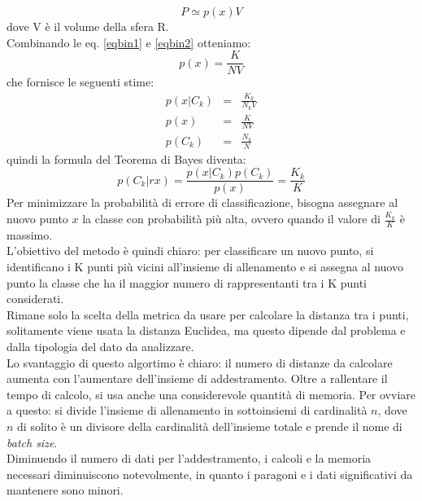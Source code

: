 \documentclass[a4paper,12pt,oneside]{book}
\begin{document}
\begin{equation} \label{eqbin2}
P\simeq p(x)V
\end{equation}
dove V \`{e} il volume della sfera R.\\
Combinando le eq. \ref{eqbin1} e \ref{eqbin2} otteniamo:
\begin{equation}
p(x)=\frac{K}{NV}
\end{equation}
che fornisce le seguenti stime:
\begin{eqnarray}
p(x|C_k)&=&\frac{K_k}{N_k V}\\
p(x)&=&\frac{K}{NV}\\
p(C_k)&=&\frac{N_k}{N}
\end{eqnarray}
quindi la formula del Teorema di Bayes diventa:%
\begin{equation}
p(C_k|r x)=\frac{p(x| C_k)p(C_k)}{p(x)}=\frac{K_k}{K}
\end{equation} 
Per minimizzare la probabilit\`{a} di errore di classificazione, bisogna assegnare al nuovo punto $x$ la classe con probabilit\`{a} pi\`{u} alta, ovvero quando il valore di $\frac{K_k}{K}$ \`{e} massimo.\\
L'obiettivo del metodo \`{e} quindi chiaro: per classificare un nuovo punto, si identificano i K punti pi\`{u} vicini all'insieme di allenamento e si assegna al nuovo punto la classe che ha il maggior numero di rappresentanti tra i K punti considerati.\\
Rimane solo la scelta della metrica da usare per calcolare la distanza tra i punti, solitamente viene usata la distanza Euclidea, ma questo dipende dal problema e dalla tipologia del dato da analizzare.\\
Lo svantaggio di questo algortimo \`{e} chiaro: il numero di distanze da calcolare aumenta con l'aumentare dell'insieme di addestramento. Oltre a rallentare il tempo di calcolo, si usa anche una considerevole quantit\`{a} di memoria. Per ovviare a questo: si divide l'insieme di allenamento in sottoinsiemi di cardinalit\`{a} $n$, dove $n$ di solito \`{e} un divisore della cardinalit\`{a} dell'insieme totale e prende il nome di \textit{batch size}.\\ Diminuendo il numero di dati per l'addestramento, i calcoli e la memoria necessari diminuiscono notevolmente, in quanto i paragoni e i dati significativi da mantenere sono minori.%
\end{document}
